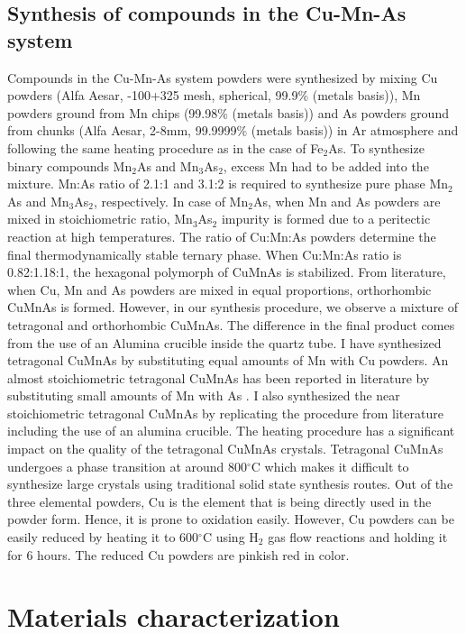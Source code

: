 \documentclass[letterpaper,10pt,doublespacing,edeposit]{uiucthesis2020}
\begin{document}
\begin{mainmatter}
\subsection{Synthesis of compounds in the Cu-Mn-As system}


Compounds in the Cu-Mn-As system powders were synthesized by mixing Cu powders (Alfa Aesar, -100+325 mesh, spherical, 99.9\% (metals basis)), Mn powders ground from Mn chips (99.98\% (metals basis)) and As powders ground from chunks (Alfa Aesar, 2-8mm, 99.9999\% (metals basis)) in Ar atmosphere and following the same heating procedure as in the case of Fe$_2$As. To synthesize binary compounds Mn$_2$As and Mn$_3$As$_2$, excess Mn had to be added into the mixture. Mn:As ratio of 2.1:1 and 3.1:2 is required to synthesize pure phase Mn$_2$As and Mn$_3$As$_2$, respectively. In case of Mn$_2$As, when Mn and As powders are mixed in stoichiometric ratio, Mn$_3$As$_2$ impurity is formed due to a peritectic reaction at high temperatures\cite{Yuzuri1960}. The ratio of Cu:Mn:As powders determine the final thermodynamically stable ternary phase. When Cu:Mn:As ratio is 0.82:1.18:1, the hexagonal polymorph of CuMnAs is stabilized. From literature, when Cu, Mn and As powders are mixed in equal proportions, orthorhombic CuMnAs is formed. However, in our synthesis procedure, we observe a mixture of tetragonal and orthorhombic CuMnAs. The difference in the final product comes from the use of an Alumina crucible inside the quartz tube. I have synthesized tetragonal CuMnAs by substituting equal amounts of Mn with Cu powders. An almost stoichiometric tetragonal CuMnAs has been reported in literature by substituting small amounts of Mn with As \cite{Uhlirova2019}. I also synthesized the near stoichiometric tetragonal CuMnAs by replicating the procedure from literature including the use of an alumina crucible. The heating procedure has a significant impact on the quality of the tetragonal CuMnAs crystals. Tetragonal CuMnAs undergoes a phase transition at around 800$^\circ$C which makes it difficult to synthesize large crystals using traditional solid state synthesis routes. Out of the three elemental powders, Cu is the element that is being directly used in the powder form. Hence, it is prone to oxidation easily. However, Cu powders can be easily reduced by heating it to 600$^\circ$C using H$_2$ gas flow reactions and holding it for 6 hours. The reduced Cu powders are pinkish red in color.

\section{Materials characterization}


\end{mainmatter}
\end{document}
